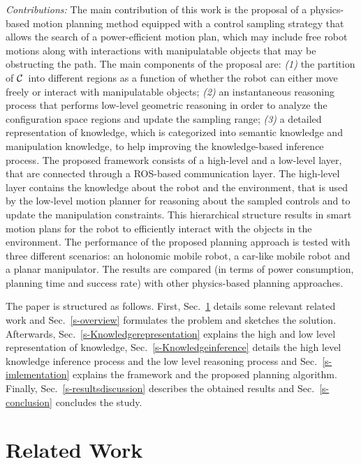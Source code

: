 \documentclass[twocolumn]{svjour3}          %
\newcommand {\Cs}{\hbox{{$\cal C$}}}                %
\begin{document}
\textit{Contributions:}
The main contribution of this work is the proposal of a physics-based motion planning method equipped with a control sampling strategy that allows the search of a  power-efficient motion plan, which 
may include free robot motions along with interactions with manipulatable objects that may be obstructing the path.
  The main components of the proposal are:
  \textit{(1)} the partition of \Cs~into different regions as a function of whether the robot can either move freely or interact with manipulatable objects; \textit{(2)} an instantaneous reasoning 
process that performs low-level geometric reasoning in order to analyze the configuration space regions and update the sampling range;
   \textit{(3)} a detailed representation of knowledge, which is categorized into semantic knowledge and manipulation knowledge, to help improving the knowledge-based inference process.
 The proposed framework consists of a high-level and a low-level layer, that are connected through a ROS-based communication layer. The high-level layer contains the knowledge about the 
robot and the environment, that is used by the low-level motion planner for reasoning about the sampled controls and to update the manipulation constraints. This hierarchical structure results in 
smart motion plans for the robot to efficiently interact with the objects in the environment.
The performance of the proposed planning approach is tested with three different scenarios: an holonomic mobile robot, a car-like mobile robot and a planar manipulator. The results are compared (in 
terms of power consumption, planning time and success rate) with other physics-based planning approaches.

The paper is structured as follows. First, Sec.~\ref{s-relatedwork} details some relevant related work and Sec.~\ref{s-overview} formulates the problem and sketches the solution. Afterwards, 
Sec.~\ref{s-Knowledgerepresentation} explains the high and low level representation of knowledge, Sec.~\ref{s-Knowledgeinference} details the high level knowledge inference process and the low level 
reasoning process and Sec.~\ref{s-imlementation} explains the framework and the proposed planning algorithm. Finally,  Sec.~\ref{s-resultsdiscussion} describes the obtained results and 
Sec.~\ref{s-conclusion} concludes the study.
\section{Related Work}\label{s-relatedwork}
\end{document}
